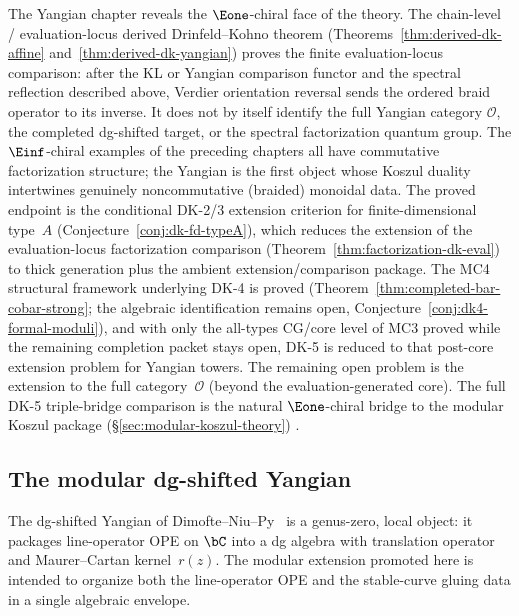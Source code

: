 The Yangian chapter reveals the $\Eone$-chiral face of the theory.
The chain-level / evaluation-locus derived Drinfeld--Kohno theorem
(Theorems~\ref{thm:derived-dk-affine}
and~\ref{thm:derived-dk-yangian}) proves the finite
evaluation-locus comparison: after the KL or Yangian comparison
functor and the spectral reflection described above, Verdier
orientation reversal sends the ordered braid operator to its inverse.
It does not by itself identify the full Yangian category
$\mathcal O$, the completed dg-shifted target, or the spectral
factorization quantum group. The $\Einf$-chiral examples
of the preceding
chapters all have commutative factorization structure; the Yangian is
the first object whose Koszul duality intertwines genuinely
noncommutative (braided) monoidal data. The proved endpoint is
the conditional DK-2/3 extension criterion for finite-dimensional
type~$A$ (Conjecture~\ref{conj:dk-fd-typeA}), which reduces the extension
of the evaluation-locus factorization comparison
\textup{(}Theorem~\ref{thm:factorization-dk-eval}\textup{)} to thick
generation plus the ambient extension/comparison package.
The MC4 structural framework underlying DK-4 is proved (Theorem~\ref{thm:completed-bar-cobar-strong}; the algebraic identification remains open, Conjecture~\ref{conj:dk4-formal-moduli}), and with only the all-types CG/core
level of MC3 proved while the remaining completion packet stays
open, DK-5 is reduced to that post-core extension problem for
Yangian towers. The remaining open problem is the extension to
the full category~$\mathcal{O}$ (beyond the evaluation-generated core).
The full DK-5 triple-bridge comparison is the natural
$\Eone$-chiral bridge to the modular Koszul package
\ifannalsedition\else
(\S\ref{sec:modular-koszul-theory})
\fi.

\subsection{The modular dg-shifted Yangian}
\label{sec:modular-dg-shifted-yangian}

The dg-shifted Yangian of
Dimofte--Niu--Py~\cite{DNP25}
is a genus-zero, local object: it packages line-operator OPE on
$\bC$ into a dg algebra with translation operator and
Maurer--Cartan kernel~$r(z)$. The modular extension promoted
here is intended to organize both the line-operator OPE and the
stable-curve gluing data in a single algebraic envelope.


